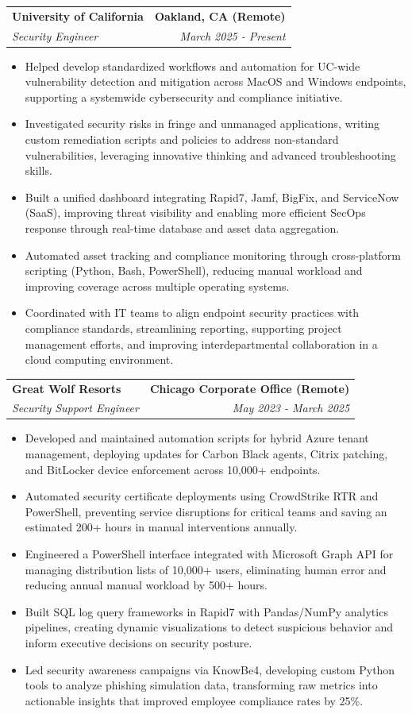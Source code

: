 \documentclass[letterpaper,10pt]{article}
\makeatletter
\newcommand{\resumeItem}[1]{\item\small{#1}}
\newcommand{\resumeItemListStart}{\begin{itemize}}
\newcommand{\resumeItemListEnd}{\end{itemize}\vspace{-2pt}}
\newcommand{\resumeSubheading}[4]{%
  \vspace{-2pt}\item
  \begin{tabular*}{\textwidth}[t]{l@{\extracolsep{\fill}}r}
    \textbf{\large #1} & \textbf{\small #2} \\
    \textit{\large #3} & \textit{\small #4} \\
  \end{tabular*}\vspace{-2pt}
}
\makeatother
\begin{document}
\resumeSubheading
  {University of California}{Oakland, CA (Remote)}
  {Security Engineer}{March 2025 - Present}
  \vspace{4pt}
\resumeItemListStart
  \resumeItem{Helped develop standardized workflows and automation for UC-wide vulnerability detection and mitigation across MacOS and Windows endpoints, supporting a systemwide cybersecurity and compliance initiative.}
  \resumeItem{Investigated security risks in fringe and unmanaged applications, writing custom remediation scripts and policies to address non-standard vulnerabilities, leveraging innovative thinking and advanced troubleshooting skills.}
  \resumeItem{Built a unified dashboard integrating Rapid7, Jamf, BigFix, and ServiceNow (SaaS), improving threat visibility and enabling more efficient SecOps response through real-time database and asset data aggregation.}
  \resumeItem{Automated asset tracking and compliance monitoring through cross-platform scripting (Python, Bash, PowerShell), reducing manual workload and improving coverage across multiple operating systems.}
  \resumeItem{Coordinated with IT teams to align endpoint security practices with compliance standards, streamlining reporting, supporting project management efforts, and improving interdepartmental collaboration in a cloud computing environment.}
\resumeItemListEnd

\vspace{6pt}

\resumeSubheading
  {Great Wolf Resorts}{Chicago Corporate Office (Remote)}
  {Security Support Engineer}{May 2023 - March 2025}
\vspace{4pt}
\resumeItemListStart
  \resumeItem{Developed and maintained automation scripts for hybrid Azure tenant management, deploying updates for Carbon Black agents, Citrix patching, and BitLocker device enforcement across 10,000+ endpoints.}
  \resumeItem{Automated security certificate deployments using CrowdStrike RTR and PowerShell, preventing service disruptions for critical teams and saving an estimated 200+ hours in manual interventions annually.}
  \resumeItem{Engineered a PowerShell interface integrated with Microsoft Graph API for managing distribution lists of 10,000+ users, eliminating human error and reducing annual manual workload by 500+ hours.}
  \resumeItem{Built SQL log query frameworks in Rapid7 with Pandas/NumPy analytics pipelines, creating dynamic visualizations to detect suspicious behavior and inform executive decisions on security posture.}
  \resumeItem{Led security awareness campaigns via KnowBe4, developing custom Python tools to analyze phishing simulation data, transforming raw metrics into actionable insights that improved employee compliance rates by 25\%.}
\resumeItemListEnd
\end{document}
